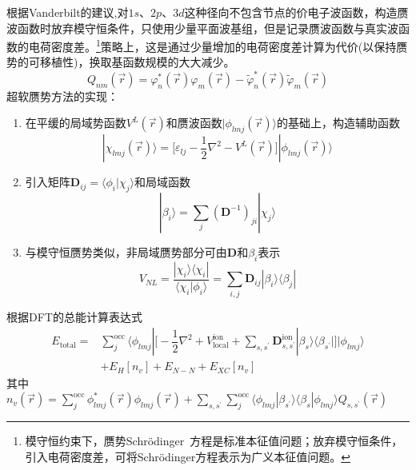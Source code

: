 根据Vanderbilt的建议,对$1s$、$2p$、$3d$这种径向不包含节点的价电子波函数，构造赝波函数时放弃模守恒条件，只使用少量平面波基组，但是记录赝波函数与真实波函数的电荷密度差。\footnote{模守恒约束下，赝势\textrm{Schr\"odinger~}方程是标准本征值问题；放弃模守恒条件，引入电荷密度差，可将\textrm{Schr\"odinger}方程表示为广义本征值问题。}策略上，这是通过少量增加的电荷密度差计算为代价(以保持赝势的可移植性)，换取基函数规模的大大减少。
\begin{equation}
	Q_{nm}(\vec r)=\varphi_n^{\ast}(\vec r)\varphi_m(\vec r)-\tilde\varphi_n^{\ast}(\vec r)\tilde\varphi_m(\vec r)
  \label{eq:uspp_4}
\end{equation}
超软赝势方法的实现：
\begin{enumerate}
	\item 在平缓的局域势函数$V^L(\vec r)$和赝波函数$|\phi_{lmj}(\vec r)\rangle$的基础上，构造辅助函数
\begin{equation}
	|\chi_{lmj}(\vec r)\rangle=\bigg[\varepsilon_{lj}-\dfrac12\nabla^2-V^L(\vec r)\bigg]|\phi_{lmj}(\vec r)\rangle
  \label{eq:uspp_1}
\end{equation}
	\item 引入矩阵$\mathbf{D}_{ij}=\langle\phi_i|\chi_j\rangle$和局域函数
\begin{equation}
	|\beta_i\rangle=\sum_j(\mathbf{D}^{-1})_{ji}|\chi_{j}\rangle
  \label{eq:uspp_2}
\end{equation}
	\item 与模守恒赝势类似，非局域赝势部分可由$\mathbf{D}$和$\beta_i$表示
\begin{equation}
	V_{NL}=\dfrac{|\chi_i\rangle\langle\chi_i|}{\langle\chi_i|\phi_i\rangle}=\sum_{i,j}\mathbf{D}_{ij}|\beta_i\rangle\langle\beta_j|
  \label{eq:uspp_3}
\end{equation}
\end{enumerate}
根据DFT的总能计算表达式
	\begin{equation}
		\begin{aligned}
			E_{\mathrm{total}}=&\sum_j^{\mathrm{occ}}\langle\phi_{lmj}|\bigg[-\dfrac12\nabla^2+V_{\mathrm{local}}^{\mathrm{ion}}+\sum_{s,s^{\prime}}\mathbf{D}_{s,s^{\prime}}^{\mathrm{ion}}|\beta_s\rangle\langle\beta_{s^{\prime}}|\bigg]|\phi_{lmj}\rangle\\
			&+E_{H}[n_v]+E_{N-N}+E_{XC}[n_v]
		\end{aligned}
  \label{eq:uspp_5}
	\end{equation}
其中$n_v(\vec r)=\sum\limits_j^{\mathrm{occ}}\phi_{lmj}^{\ast}(\vec r)\phi_{lmj}(\vec r)+\sum\limits_{s,s^{\prime}}\sum\limits_j^{\mathrm{occ}}\langle\phi_{lmj}|\beta_{s^{\prime}}\rangle\langle\beta_s|\phi_{lmj}\rangle Q_{s,s^{\prime}}(\vec r)$
